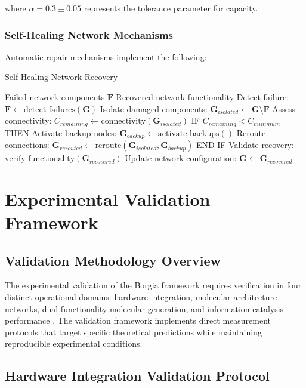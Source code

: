 \documentclass[12pt,a4paper]{article}
\begin{document}
where $\alpha = 0.3 \pm 0.05$ represents the tolerance parameter for capacity.

\subsubsection{Self-Healing Network Mechanisms}

Automatic repair mechanisms implement the following:

\begin{algorithm}[H]
\caption{Self-Healing Network Recovery}
\begin{algorithmic}[1]
\REQUIRE Failed network components $\mathbf{F}$
\ENSURE Recovered network functionality
\STATE Detect failure: $\mathbf{F} \leftarrow \text{detect\_failures}(\mathbf{G})$
\STATE Isolate damaged components: $\mathbf{G}_{isolated} \leftarrow \mathbf{G} \setminus \mathbf{F}$
\STATE Assess connectivity: $C_{remaining} \leftarrow \text{connectivity}(\mathbf{G}_{isolated})$
\STATE IF $C_{remaining} < C_{minimum}$ THEN
\STATE \quad Activate backup nodes: $\mathbf{G}_{backup} \leftarrow \text{activate\_backups}()$
\STATE \quad Reroute connections: $\mathbf{G}_{rerouted} \leftarrow \text{reroute}(\mathbf{G}_{isolated}, \mathbf{G}_{backup})$
\STATE END IF
\STATE Validate recovery: $\text{verify\_functionality}(\mathbf{G}_{recovered})$
\STATE Update network configuration: $\mathbf{G} \leftarrow \mathbf{G}_{recovered}$
\end{algorithmic}
\end{algorithm}

\section{Experimental Validation Framework}

\subsection{Validation Methodology Overview}

The experimental validation of the Borgia framework requires verification in four distinct operational domains: hardware integration, molecular architecture networks, dual-functionality molecular generation, and information catalysis performance \cite{sterling2015principles}. The validation framework implements direct measurement protocols that target specific theoretical predictions while maintaining reproducible experimental conditions.

\subsection{Hardware Integration Validation Protocol}
\end{document}

